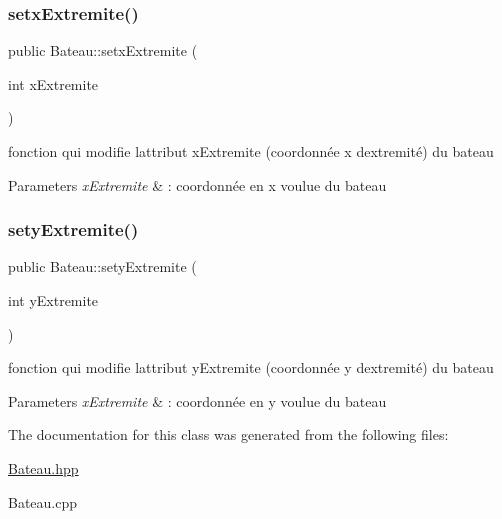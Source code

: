 \subsubsection{\texorpdfstring{setx\+Extremite()}{setxExtremite()}}
{\footnotesize\ttfamily public Bateau\+::setx\+Extremite (\begin{DoxyParamCaption}\item[{int}]{x\+Extremite }\end{DoxyParamCaption})}



fonction qui modifie l\textquotesingle{}attribut x\+Extremite (coordonnée x d\textquotesingle{}extremité) du bateau 


\begin{DoxyParams}{Parameters}
{\em x\+Extremite} & \+: coordonnée en x voulue du bateau \\
\hline
\end{DoxyParams}
\mbox{\label{class_bateau_a7fa9258d53309fcf41de04199d702fe7}} 
\subsubsection{\texorpdfstring{sety\+Extremite()}{setyExtremite()}}
{\footnotesize\ttfamily public Bateau\+::sety\+Extremite (\begin{DoxyParamCaption}\item[{int}]{y\+Extremite }\end{DoxyParamCaption})}



fonction qui modifie l\textquotesingle{}attribut y\+Extremite (coordonnée y d\textquotesingle{}extremité) du bateau 


\begin{DoxyParams}{Parameters}
{\em x\+Extremite} & \+: coordonnée en y voulue du bateau \\
\hline
\end{DoxyParams}


The documentation for this class was generated from the following files\+:\begin{DoxyCompactItemize}
\item 
\mbox{\hyperlink{_bateau_8hpp}{Bateau.\+hpp}}\item 
Bateau.\+cpp\end{DoxyCompactItemize}
